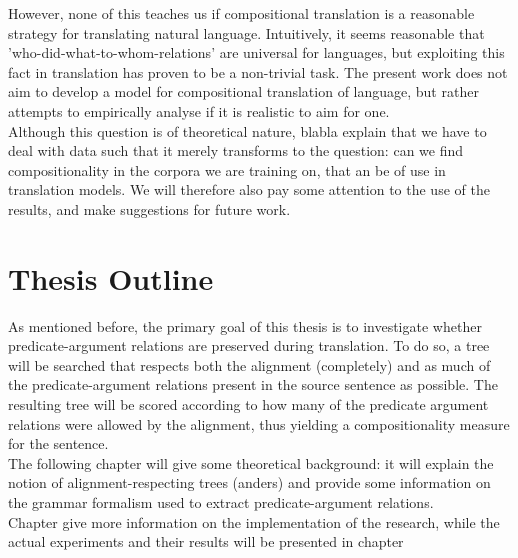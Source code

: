 \documentclass{report}
\theoremstyle{definition}
\theoremstyle{plain}
\begin{document}



However, none of this teaches us if compositional translation is a reasonable strategy for translating natural language. Intuitively, it seems reasonable that 'who-did-what-to-whom-relations' are universal for languages, but exploiting this fact in translation has proven to be a non-trivial task. The present work does not aim to develop a model for compositional translation of language, but rather attempts to empirically analyse if it is realistic to aim for one.\\
Although this question is of theoretical nature, blabla explain that we have to deal with data such that it merely transforms to the question: can we find compositionality in the corpora we are training on, that an be of use in translation models. We will therefore also pay some attention to the use of the results, and make suggestions for future work.


\section*{Thesis Outline}

As mentioned before, the primary goal of this thesis is to investigate whether predicate-argument relations are preserved during translation. To do so, a tree will be searched that respects both the alignment (completely) and as much of the predicate-argument relations present in the source sentence as possible. The resulting tree will be scored according to how many of the predicate argument relations were allowed by the alignment, thus yielding a compositionality measure for the sentence.\\
The following chapter will give some theoretical background: it will explain the notion of alignment-respecting trees (anders) and provide some information on the grammar formalism used to extract predicate-argument relations.\\
Chapter give more information on the implementation of the research, while the actual experiments and their results will be presented in chapter 
\end{document}
